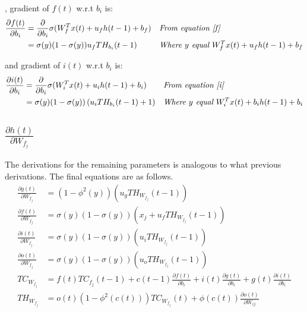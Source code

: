 \documentclass{article}
\begin{document}
, gradient of $f(t)$  w.r.t $b_i$ is:
\begin{align*}
\frac{\partial f(t)}{\partial b_i} &=  \frac{\partial}{\partial b_i} \sigma(W_{f}^T x(t) + u_{f} h(t-1) + b_f) && \textit{From equation \ref{f}} \\
&= \sigma(y)(1-\sigma(y))u_f TH_{b_i}(t-1) && \textit{Where $y$ equal $W_{f}^T x(t) + u_{f} h(t-1) + b_f$} \\
\end{align*}

and gradient of $i(t)$  w.r.t $b_i$ is:
\begin{align*}
\frac{\partial i(t)}{\partial b_i} &=  \frac{\partial}{\partial b_i} \sigma(W_{i}^T x(t) + u_i h(t-1) + b_i) && \textit{From equation \ref{i}} \\
&= \sigma(y)(1-\sigma(y)) \left (u_i TH_{b_i}(t-1) + 1 \right )&& \textit{Where $y$ equal $W_{i}^T x(t) + b_i h(t-1) + b_i$} \\
\end{align*}


\subsection{$\frac{\partial h(t)}{\partial W_{f_j}}$}
The derivations for the remaining parameters is analogous to what previous derivations. The final equations are as follows.
\begin{equation}
\begin{aligned}
\frac{\partial g(t)}{\partial W_{f_j}} &=  (1-\phi^2(y))(u_g TH_{W_{f_j}}(t-1))  \\
\frac{\partial f(t)}{\partial W_{f_j}} &=  \sigma(y)(1-\sigma(y))( x_j + u_f TH_{W_{f_j}}(t-1)) \\
\frac{\partial i(t)}{\partial W_{f_j}}  &= \sigma(y)(1-\sigma(y))( u_i TH_{W_{f_j}}(t-1))  \\
\frac{\partial o(t)}{\partial W_{f_j}} &=  \sigma(y)(1-\sigma(y))( u_o TH_{W_{f_j}}(t-1))  \\
TC_{W_{f_j}}&= f(t) TC_{f_j}(t-1) + c(t-1)\frac{\partial f(t)}{ \partial b_i} + i(t)\frac{\partial g(t) }{\partial b_i}  + g(t)\frac{\partial i(t) }{\partial b_i}  \\
TH_{W_{f_j}}&= o(t) (1-\phi^{2}(c(t))) TC_{W_{f_j}}(t)  + \phi(c(t)) \frac{\partial o(t)}{\partial W_{ij}}  
\end{aligned}
\end{equation}
\end{document}
